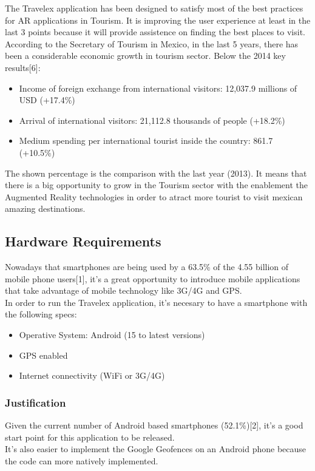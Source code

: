 The Travelex application has been designed to satisfy most of the best practices for AR applications in Tourism.
It is improving the user experience at least in the last 3 points because it will provide assistence on finding 
the best places to visit. \\

According to the Secretary of Tourism in Mexico, in the last 5 years, there has been a considerable economic growth
in tourism sector. Below the 2014 key results[6]:\\

\begin{itemize}
  \item Income of foreign exchange from international visitors: 12,037.9 millions of USD (+17.4\%)
  \item Arrival of international visitors: 21,112.8 thousands of people (+18.2\%)
  \item Medium spending per international tourist inside the country: 861.7 (+10.5\%)
\end{itemize}

The shown percentage is the comparison with the last year (2013). It means that there is a big opportunity to grow 
in the Tourism sector with the enablement the Augmented Reality technologies in order to atract more tourist to
visit mexican amazing destinations.


\subsection{Hardware Requirements}
Nowadays that smartphones are being used by a 63.5\% of  the 4.55 billion of mobile phone users[1], it's a great 
opportunity to introduce mobile applications that take advantage of mobile technology like 3G/4G and GPS. \\

In order to run the Travelex application, it's necesary to have a smartphone with the following specs:

\begin{itemize}
  \item Operative System: Android (15 to latest versions)
  \item GPS enabled  
  \item Internet connectivity (WiFi or 3G/4G)
\end{itemize}


\subsubsection{Justification}
Given the current number of Android based smartphones (52.1\%)[2], it's a good start point for this application to be 
released. \\
It's also easier to implement the Google Geofences on an Android phone because the code can more natively implemented.

